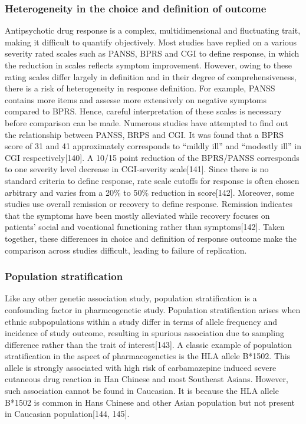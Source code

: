 \documentclass[12pt]{report}
\begin{document}
			\subsubsection{Heterogeneity in the choice and definition of outcome}
				Antipsychotic drug response is a complex, multidimensional and fluctuating trait, making it difficult to quantify objectively. 
				Most studies have replied on a various severity rated scales such as PANSS, BPRS and CGI to define response, in which the reduction in scales reflects symptom improvement. 
				However, owing to these rating scales differ largely in definition and in their degree of comprehensiveness, there is a risk of heterogeneity in response definition. 
				For example, PANSS contains more items and assesse more extensively on negative symptoms compared to BPRS. 
				Hence, careful interpretation of these scales is necessary before comparison can be made. 
				Numerous studies have attempted to find out the relationship between PANSS, BRPS and CGI. 
				It was found that a BPRS score of 31 and 41 approximately corresponds to ``mildly ill'' and ``modestly ill'' in CGI respectively[140].
				A 10/15 point reduction of the BPRS/PANSS corresponds to one severity level decrease in CGI-severity scale[141]. 
				Since there is no standard criteria to define response, rate scale cutoffs for response is often chosen arbitrary and varies from a 20$\%$ to 50$\%$ reduction in score[142].  
				Moreover, some studies use overall remission or recovery to define response. 
				Remission indicates that the symptoms have been mostly alleviated while recovery focuses on patients' social and vocational functioning rather than symptoms[142]. 
				Taken together, these differences in choice and definition of response outcome make the comparison across studies difficult, leading to failure of replication.  
			\subsubsection{Population stratification}
				Like any other genetic association study, population stratification is a confounding factor in pharmcogenetic study. 
				Population stratification arises when ethnic subpopulations within a study differ in terms of allele frequency and incidence of study outcome, resulting in spurious association due to sampling difference rather than the trait of interest[143]. 
				A classic example of population stratification in the aspect of pharmacogenetics is the HLA allele B*1502. 
				This allele is strongly associated with high risk of carbamazepine induced severe cutaneous drug reaction in Han Chinese and most Southeast Asians. 
				However, such association cannot be found in Caucasian. 
				It is because the HLA allele B*1502 is common in Hans Chinese and other Asian population but not present in Caucasian population[144, 145].   
				
\end{document}
